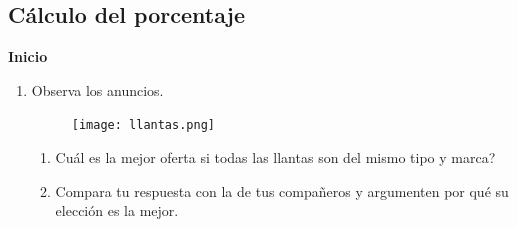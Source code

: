 \documentclass[11pt]{book}
\begin{document}
\subsection{Cálculo del porcentaje}

\begin{boxK}
  \begin{center}\textbf{Inicio}\end{center}

  \begin{enumerate}
    \item Observa los anuncios.
          \begin{figure}[H]
            \centering
            \texttt{[image: llantas.png]}
          \end{figure}
          \begin{enumerate}
            \item Cuál es la mejor oferta si todas las llantas son del mismo tipo y marca?
            \item Compara tu respuesta con la de tus compañeros y argumenten por qué su elección es la mejor.
          \end{enumerate}
  \end{enumerate}
\end{boxK}
\end{document}
